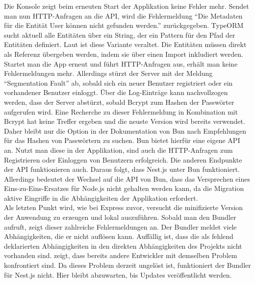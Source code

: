 {\noindent
Die Konsole zeigt beim erneuten Start der Applikation keine Fehler mehr. Sendet man nun HTTP-Anfragen an die API, wird die Fehlermeldung ``Die Metadaten für die Entität User können nicht gefunden werden.'' zurückgegeben. TypeORM sucht aktuell alle Entitäten über ein String, der ein Pattern für den Pfad der Entitäten definiert. Laut \cite{TypeORM.2021} ist diese Variante veraltet. Die Entitäten müssen direkt als Referenz übergeben werden, indem sie über einen Import inkludiert werden. \newline
Startet man die App erneut und führt HTTP-Anfragen aus, erhält man keine Fehlermeldungen mehr. Allerdings stürzt der Server mit der Meldung ``Segmentation Fault'' ab, sobald sich ein neuer Benutzer registriert oder ein vorhandener Benutzer einloggt. Über die Log-Einträge kann nachvollzogen werden, dass der Server abstürzt, sobald Bcrypt zum Hashen der Passwörter aufgerufen wird. Eine Recherche zu dieser Fehlermeldung in Kombination mit Bcrypt hat keine Treffer ergeben und die neuste Version wird bereits verwendet. Daher bleibt nur die Option in der Dokumentation von Bun nach Empfehlungen für das Hashen von Passwörtern zu suchen. Bun bietet hierfür eine eigene API an. Nutzt man diese in der Applikation, sind auch die HTTP-Anfragen zum Registrieren oder Einloggen von Benutzern erfolgreich. Die anderen Endpunkte der API funktionieren auch. Daraus folgt, dass Nest.js unter Bun funktioniert. Allerdings bedeutet der Wechsel auf die API von Bun, dass das Versprechen eines Eins-zu-Eins-Ersatzes für Node.js nicht gehalten werden kann, da die Migration aktive Eingriffe in die Abhängigkeiten der Applikation erfordert.\\

\noindent
Als letzten Punkt wird, wie bei Express zuvor, versucht die minifizierte Version der Anwendung zu erzeugen und lokal auszuführen. Sobald man den Bundler aufruft, zeigt dieser zahlreiche Fehlermeldungen an. Der Bundler meldet viele Abhängigkeiten, die er nicht auflösen kann.  Auffällig ist, dass die als fehlend deklarierten Abhängigkeiten in den direkten Abhängigkeiten des Projekts nicht vorhanden sind. \cite{Postek.2023} zeigt, dass bereits andere Entwickler mit demselben Problem konfrontiert sind. Da dieses Problem derzeit ungelöst ist, funktioniert der Bundler für Nest.js nicht. Hier bleibt abzuwarten, bis Updates veröffentlicht werden.

}
